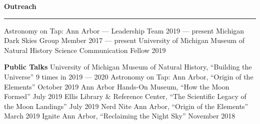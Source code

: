 \documentclass[10pt]{article}
\newcommand{\header}[1]{\vspace{2em}\par \textbf{\large #1}\strut\hrule\vspace{0em}}
\newcommand{\actionHeader}[2]{\textbf{#1 \hfill #2}}
\newcommand{\justifiedItemDate}[2]{\newline\null#1 \hfill #2}
\newcommand{\justifiedItemDateFirst}[2]{#1 \hfill #2}
\newcommand{\indentedItem}[1]{\newline\null\qquad #1}
\begin{document}





\header{Outreach}
\justifiedItemDateFirst{Astronomy on Tap: Ann Arbor --- Leadership Team}{2019 --- present}
\justifiedItemDate{Michigan Dark Skies Group Member}{2017 --- present}
\justifiedItemDate{University of Michigan Museum of Natural History Science Communication Fellow}{2019}

{\actionHeader{Public Talks}{}}
\justifiedItemDate{University of Michigan Museum of Natural History, ``Building the Universe''}{9 times in 2019 --- 2020}
\justifiedItemDate{Astronomy on Tap: Ann Arbor, ``Origin of the Elements''}{October 2019}
\justifiedItemDate{Ann Arbor Hands-On Museum, ``How the Moon Formed''}{July 2019}
\justifiedItemDate{Ellis Library \& Reference Center, ``The Scientific Legacy of the Moon Landings''}{July 2019}
\justifiedItemDate{Nerd Nite Ann Arbor, ``Origin of the Elements''}{March 2019}
\justifiedItemDate{Ignite Ann Arbor, ``Reclaiming the Night Sky''}{November 2018}




\end{document}
